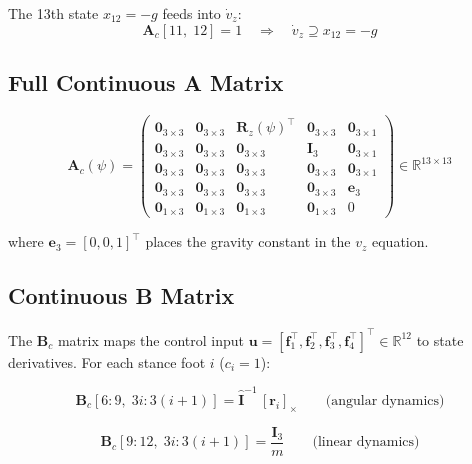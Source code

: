 \documentclass[12pt,a4paper]{report}
\newcommand{\vect}[1]{\bm{#1}}
\newcommand{\mat}[1]{\mathbf{#1}}
\newcommand{\R}{\mathbb{R}}
\newcommand{\skew}[1]{[#1]_{\times}}
\begin{document}
The 13th state $x_{12} = -g$ feeds into $\dot v_z$:
\begin{equation}
    \mat{A}_c[11,\; 12] = 1
    \quad\Longrightarrow\quad
    \dot v_z \supseteq x_{12} = -g
\end{equation}

\subsection{Full Continuous A Matrix}

\begin{equation}
    \mat{A}_c(\psi) =
    \begin{pmatrix}
        \mat{0}_{3\times3} & \mat{0}_{3\times3} & \mat{R}_z(\psi)^\top & \mat{0}_{3\times3} & \mat{0}_{3\times1} \\
        \mat{0}_{3\times3} & \mat{0}_{3\times3} & \mat{0}_{3\times3} & \mat{I}_3 & \mat{0}_{3\times1} \\
        \mat{0}_{3\times3} & \mat{0}_{3\times3} & \mat{0}_{3\times3} & \mat{0}_{3\times3} & \mat{0}_{3\times1} \\
        \mat{0}_{3\times3} & \mat{0}_{3\times3} & \mat{0}_{3\times3} & \mat{0}_{3\times3} & \vect{e}_3 \\
        \mat{0}_{1\times3} & \mat{0}_{1\times3} & \mat{0}_{1\times3} & \mat{0}_{1\times3} & 0
    \end{pmatrix}
    \in \R^{13\times13}
    \label{eq:Ac}
\end{equation}

where $\vect{e}_3 = [0,0,1]^\top$ places the gravity constant in the $v_z$ equation.

\subsection{Continuous B Matrix}

The $\mat{B}_c$ matrix maps the control input
$\vect{u} = [\vect{f}_1^\top, \vect{f}_2^\top, \vect{f}_3^\top, \vect{f}_4^\top]^\top \in \R^{12}$
to state derivatives.  For each stance foot $i$ ($c_i = 1$):

\begin{equation}
    \mat{B}_c[6\!:\!9,\; 3i\!:\!3(i+1)] = \hat{\mat{I}}^{-1}\,\skew{\vect{r}_i}
    \qquad\text{(angular dynamics)}
    \label{eq:Bc_ang}
\end{equation}

\begin{equation}
    \mat{B}_c[9\!:\!12,\; 3i\!:\!3(i+1)] = \frac{\mat{I}_3}{m}
    \qquad\text{(linear dynamics)}
    \label{eq:Bc_lin}
\end{equation}
\end{document}
